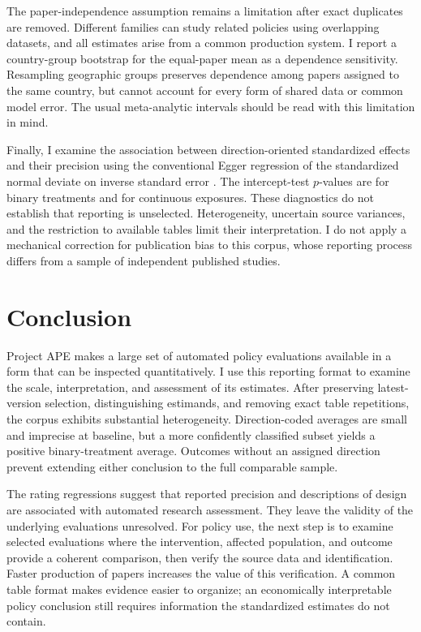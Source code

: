 \documentclass[11pt]{article}
\begin{document}
The paper-independence assumption remains a limitation after exact duplicates are removed. Different families can study related policies using overlapping datasets, and all estimates arise from a common production system. I report a country-group bootstrap for the equal-paper mean as a dependence sensitivity. Resampling geographic groups preserves dependence among papers assigned to the same country, but cannot account for every form of shared data or common model error. The usual meta-analytic intervals should be read with this limitation in mind.

Finally, I examine the association between direction-oriented standardized effects and their precision using the conventional Egger regression of the standardized normal deviate on inverse standard error \citep{egger}. The intercept-test $p$-values are \BinaryEggerP{} for binary treatments and \ContinuousEggerP{} for continuous exposures. These diagnostics do not establish that reporting is unselected. Heterogeneity, uncertain source variances, and the restriction to available tables limit their interpretation. I do not apply a mechanical correction for publication bias to this corpus, whose reporting process differs from a sample of independent published studies.

\section{Conclusion}\label{sec:conclusion}
Project APE makes a large set of automated policy evaluations available in a form that can be inspected quantitatively. I use this reporting format to examine the scale, interpretation, and assessment of its estimates. After preserving latest-version selection, distinguishing estimands, and removing exact table repetitions, the corpus exhibits substantial heterogeneity. Direction-coded averages are small and imprecise at baseline, but a more confidently classified subset yields a positive binary-treatment average. Outcomes without an assigned direction prevent extending either conclusion to the full comparable sample.

The rating regressions suggest that reported precision and descriptions of design are associated with automated research assessment. They leave the validity of the underlying evaluations unresolved. For policy use, the next step is to examine selected evaluations where the intervention, affected population, and outcome provide a coherent comparison, then verify the source data and identification. Faster production of papers increases the value of this verification. A common table format makes evidence easier to organize; an economically interpretable policy conclusion still requires information the standardized estimates do not contain.
\end{document}
